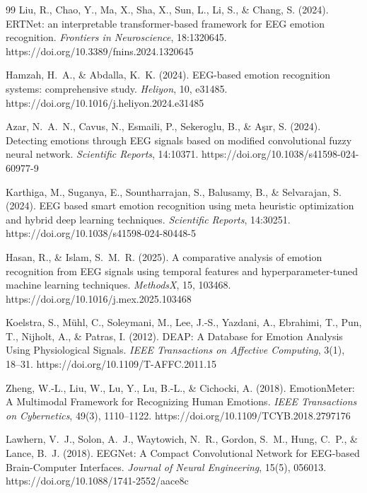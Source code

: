 \documentclass[11pt]{report}
\begin{document}
\begin{thebibliography}{99}
Liu, R., Chao, Y., Ma, X., Sha, X., Sun, L., Li, S., \& Chang, S. (2024).
ERTNet: an interpretable transformer-based framework for EEG emotion
recognition. \emph{Frontiers in Neuroscience}, 18:1320645.
https://doi.org/10.3389/fnins.2024.1320645

Hamzah, H.~A., \& Abdalla, K.~K. (2024). EEG-based emotion recognition
systems: comprehensive study. \emph{Heliyon}, 10, e31485.
https://doi.org/10.1016/j.heliyon.2024.e31485

Azar, N.~A.~N., Cavus, N., Esmaili, P., Sekeroglu, B., \& Aşır, S. (2024).
Detecting emotions through EEG signals based on modified convolutional
fuzzy neural network. \emph{Scientific Reports}, 14:10371.
https://doi.org/10.1038/s41598-024-60977-9

Karthiga, M., Suganya, E., Sountharrajan, S., Balusamy, B., \& Selvarajan,
S. (2024). EEG based smart emotion recognition using meta heuristic
optimization and hybrid deep learning techniques. \emph{Scientific
Reports}, 14:30251. https://doi.org/10.1038/s41598-024-80448-5

Hasan, R., \& Islam, S.~M.~R. (2025). A comparative analysis of emotion
recognition from EEG signals using temporal features and
hyperparameter-tuned machine learning techniques. \emph{MethodsX}, 15,
103468. https://doi.org/10.1016/j.mex.2025.103468

Koelstra, S., M\"uhl, C., Soleymani, M., Lee, J.-S., Yazdani, A., Ebrahimi,
T., Pun, T., Nijholt, A., \& Patras, I. (2012). DEAP: A Database for
Emotion Analysis Using Physiological Signals. \emph{IEEE Transactions on
Affective Computing}, 3(1), 18--31. https://doi.org/10.1109/T-AFFC.2011.15

Zheng, W.-L., Liu, W., Lu, Y., Lu, B.-L., \& Cichocki, A. (2018).
EmotionMeter: A Multimodal Framework for Recognizing Human Emotions.
\emph{IEEE Transactions on Cybernetics}, 49(3), 1110--1122.
https://doi.org/10.1109/TCYB.2018.2797176

Lawhern, V.~J., Solon, A.~J., Waytowich, N.~R., Gordon, S.~M., Hung, C.~P.,
\& Lance, B.~J. (2018). EEGNet: A Compact Convolutional Network for
EEG-based Brain-Computer Interfaces. \emph{Journal of Neural Engineering},
15(5), 056013. https://doi.org/10.1088/1741-2552/aace8c


\end{thebibliography}
\end{document}
